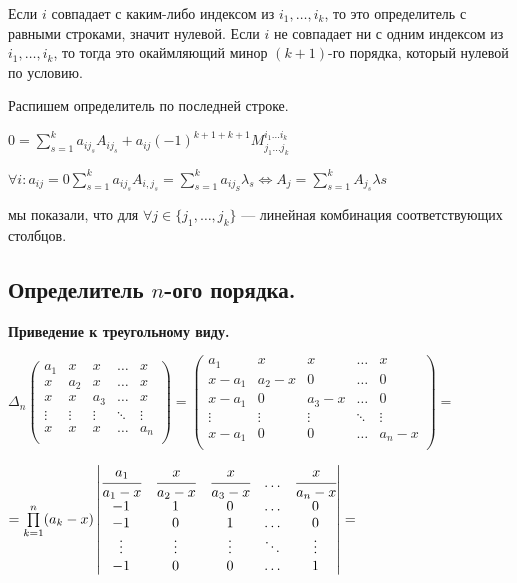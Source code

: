 \documentclass[twoside]{book}
\begin{document}
Если \(i\) совпадает с каким-либо индексом из \(i_1, \ldots, i_k\), то это определитель с равными строками, значит нулевой. Если \(i\) не совпадает ни с одним индексом из \(i_1, \ldots, i_k\), то тогда это окаймляющий минор \((k + 1)\)-го порядка, который нулевой по условию.

Распишем определитель по последней строке.

\( 0  = \sum\limits_{s=1}^{k} a_{i j_s} A_{ij_s} + a_{ij} (-1)^{k+1+k+1} M_{j_1\ldots j_k}^{i_1 \ldots i_k}\)

\(\forall i : a_{ij} =  0 \sum\limits_{s=1}^k a_{i j_s} A_{i,j_s} = \sum\limits_{s=1}^{k}a_{ij_S} \lambda_s \Leftrightarrow A_j = \sum\limits_{s=1}^{k}  A_{j_s} \lambda s\)

мы показали, что для \(\forall j \in \{j_1,\ldots,j_k\}\) --- линейная комбинация  соответствующих столбцов.


\subsection{Определитель \(n\)-ого порядка.}


\textbf{Приведение к треугольному виду.}

\( \Delta_n \begin{pmatrix}
    a_1    & x      & x      & \ldots & x      \\
    x      & a_2    & x      & \ldots & x      \\
    x      & x      & a_3    & \ldots & x      \\
    \vdots & \vdots & \vdots & \ddots & \vdots \\
    x      & x      & x      & \ldots & a_n    \\
\end{pmatrix}
=
\begin{pmatrix}
    a_1    & x       & x      & \ldots & x      \\
    x-a_1  & a_2 - x & 0      & \ldots & 0      \\
    x-a_1  & 0       & a_3 -x & \ldots & 0      \\
    \vdots & \vdots  & \vdots & \ddots & \vdots \\
    x-a_1  & 0       & 0      & \ldots & a_n-x  \\
\end{pmatrix}
=\)


\( =
\prod\limits_{k=1}^n (a_k-x)
\begin{vmatrix}
    \cfrac{a_1}{a_1-x} & \cfrac{x}{a_2-x} & \cfrac{x}{a_3-x} & \ldots & \cfrac{x}{a_n-x} \\
    -1                 & 1                & 0                & \ldots & 0                \\
    -1                 & 0                & 1                & \ldots & 0                \\
    \vdots             & \vdots           & \vdots           & \ddots & \vdots           \\
    -1                 & 0                & 0                & \ldots & 1                \\
\end{vmatrix}
= \)
\end{document}
